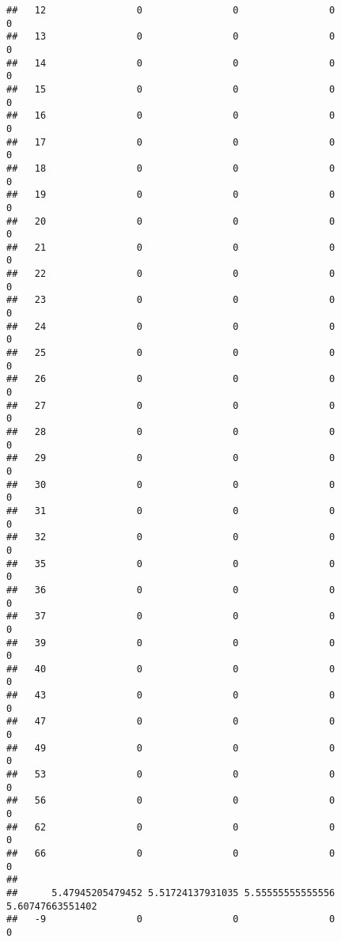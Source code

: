 \documentclass[]{article}
\begin{document}
\begin{verbatim}
##   12                0                0                0                0
##   13                0                0                0                0
##   14                0                0                0                0
##   15                0                0                0                0
##   16                0                0                0                0
##   17                0                0                0                0
##   18                0                0                0                0
##   19                0                0                0                0
##   20                0                0                0                0
##   21                0                0                0                0
##   22                0                0                0                0
##   23                0                0                0                0
##   24                0                0                0                0
##   25                0                0                0                0
##   26                0                0                0                0
##   27                0                0                0                0
##   28                0                0                0                0
##   29                0                0                0                0
##   30                0                0                0                0
##   31                0                0                0                0
##   32                0                0                0                0
##   35                0                0                0                0
##   36                0                0                0                0
##   37                0                0                0                0
##   39                0                0                0                0
##   40                0                0                0                0
##   43                0                0                0                0
##   47                0                0                0                0
##   49                0                0                0                0
##   53                0                0                0                0
##   56                0                0                0                0
##   62                0                0                0                0
##   66                0                0                0                0
##     
##      5.47945205479452 5.51724137931035 5.55555555555556 5.60747663551402
##   -9                0                0                0                0

\end{verbatim}
\end{document}

